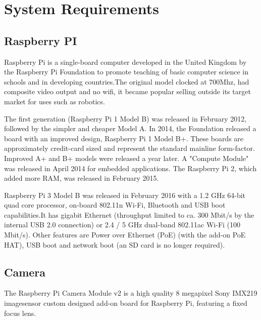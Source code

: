 \section{System Requirements}
\subsection{Raspberry PI}
Raspberry Pi is a single-board computer developed in the United Kingdom by the Raspberry Pi Foundation to promote teaching of basic computer science in schools and in developing countries.The original model clocked at 700Mhz, had composite video output and no wifi, it became popular selling outside its target market for uses such as robotics. 

The first generation (Raspberry Pi 1 Model B) was released in February 2012, followed by the simpler and cheaper Model A. In 2014, the Foundation released a board with an improved design, Raspberry Pi 1 Model B+. These boards are approximately credit-card sized and represent the standard mainline form-factor. Improved A+ and B+ models were released a year later. A "Compute Module" was released in April 2014 for embedded applications. The Raspberry Pi 2, which added more RAM, was released in February 2015.

Raspberry Pi 3 Model B was released in February 2016 with a 1.2 GHz 64-bit quad core processor, on-board 802.11n Wi-Fi, Bluetooth and USB boot capabilities.It has gigabit Ethernet (throughput limited to ca. 300 Mbit/s by the internal USB 2.0 connection) or 2.4 / 5 GHz dual-band 802.11ac Wi-Fi (100 Mbit/s). Other features are Power over Ethernet (PoE) (with the add-on PoE HAT), USB boot and network boot (an SD card is no longer required).

\subsection{Camera}
The Raspberry Pi Camera Module v2 is a high quality 8 megapixel Sony IMX219 imagesensor custom designed add-on board for Raspberry Pi, featuring a fixed focus lens.